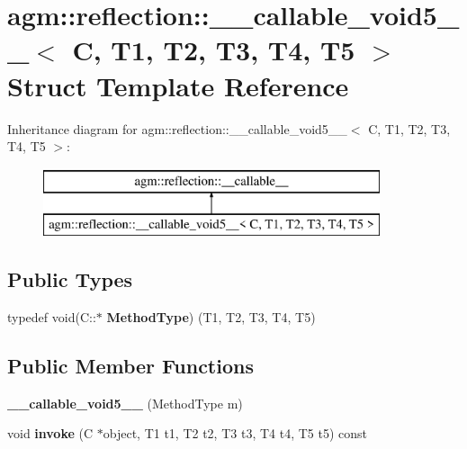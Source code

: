 \hypertarget{structagm_1_1reflection_1_1____callable__void5____}{}\section{agm\+:\+:reflection\+:\+:\+\_\+\+\_\+callable\+\_\+void5\+\_\+\+\_\+$<$ C, T1, T2, T3, T4, T5 $>$ Struct Template Reference}
\label{structagm_1_1reflection_1_1____callable__void5____}
Inheritance diagram for agm\+:\+:reflection\+:\+:\+\_\+\+\_\+callable\+\_\+void5\+\_\+\+\_\+$<$ C, T1, T2, T3, T4, T5 $>$\+:\begin{figure}[H]
\begin{center}
\leavevmode
\includegraphics[height=2.000000cm]{structagm_1_1reflection_1_1____callable__void5____}
\end{center}
\end{figure}
\subsection*{Public Types}
\begin{DoxyCompactItemize}
\item 
typedef void(C\+::$\ast$ {\bfseries Method\+Type}) (T1, T2, T3, T4, T5)\hypertarget{structagm_1_1reflection_1_1____callable__void5_____a56796c8d0af8633e4f0515b88e5e3b6d}{}\label{structagm_1_1reflection_1_1____callable__void5_____a56796c8d0af8633e4f0515b88e5e3b6d}

\end{DoxyCompactItemize}
\subsection*{Public Member Functions}
\begin{DoxyCompactItemize}
\item 
{\bfseries \+\_\+\+\_\+callable\+\_\+void5\+\_\+\+\_\+} (Method\+Type m)\hypertarget{structagm_1_1reflection_1_1____callable__void5_____a4c0822f2ca25a2b35f333a7dd9054327}{}\label{structagm_1_1reflection_1_1____callable__void5_____a4c0822f2ca25a2b35f333a7dd9054327}

\item 
void {\bfseries invoke} (C $\ast$object, T1 t1, T2 t2, T3 t3, T4 t4, T5 t5) const \hypertarget{structagm_1_1reflection_1_1____callable__void5_____a8898b94706ab940b2c9cd76144816257}{}\label{structagm_1_1reflection_1_1____callable__void5_____a8898b94706ab940b2c9cd76144816257}

\end{DoxyCompactItemize}
